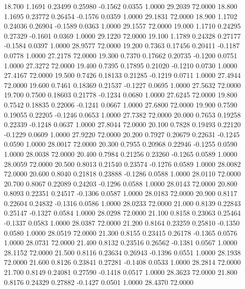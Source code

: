   18.700   1.1691   0.23499   0.25980  -0.1562   0.0355   1.0000  29.2039  72.0000
  18.800   1.1695   0.23772   0.26454  -0.1576   0.0359   1.0000  29.1831  72.0000
  18.900   1.1702   0.24036   0.26904  -0.1589   0.0363   1.0000  29.1557  72.0000
  19.000   1.1710   0.24295   0.27329  -0.1601   0.0369   1.0000  29.1220  72.0000
  19.100   1.1789   0.24328   0.27177  -0.1584   0.0397   1.0000  28.9577  72.0000
  19.200   0.7363   0.17456   0.20411  -0.1187   0.0778   1.0000  27.2178  72.0000
  19.300   0.7370   0.17662   0.20735  -0.1200   0.0751   1.0000  27.3272  72.0000
  19.400   0.7395   0.17895   0.21020  -0.1210   0.0730   1.0000  27.4167  72.0000
  19.500   0.7426   0.18133   0.21285  -0.1219   0.0711   1.0000  27.4944  72.0000
  19.600   0.7461   0.18369   0.21537  -0.1227   0.0695   1.0000  27.5632  72.0000
  19.700   0.7500   0.18603   0.21778  -0.1234   0.0680   1.0000  27.6245  72.0000
  19.800   0.7542   0.18835   0.22006  -0.1241   0.0667   1.0000  27.6800  72.0000
  19.900   0.7590   0.19055   0.22205  -0.1246   0.0653   1.0000  27.7382  72.0000
  20.000   0.7653   0.19258   0.22339  -0.1248   0.0637   1.0000  27.8044  72.0000
  20.100   0.7828   0.19493   0.22120  -0.1229   0.0609   1.0000  27.9220  72.0000
  20.200   0.7927   0.20679   0.22631  -0.1245   0.0590   1.0000  28.0017  72.0000
  20.300   0.7955   0.20968   0.22946  -0.1255   0.0590   1.0000  28.0038  72.0000
  20.400   0.7984   0.21256   0.23260  -0.1265   0.0589   1.0000  28.0059  72.0000
  20.500   0.8013   0.21540   0.23574  -0.1276   0.0589   1.0000  28.0082  72.0000
  20.600   0.8040   0.21818   0.23888  -0.1286   0.0588   1.0000  28.0110  72.0000
  20.700   0.8067   0.22089   0.24203  -0.1296   0.0588   1.0000  28.0143  72.0000
  20.800   0.8093   0.22351   0.24517  -0.1306   0.0587   1.0000  28.0183  72.0000
  20.900   0.8117   0.22604   0.24832  -0.1316   0.0586   1.0000  28.0233  72.0000
  21.000   0.8139   0.22843   0.25147  -0.1327   0.0584   1.0000  28.0298  72.0000
  21.100   0.8158   0.23063   0.25464  -0.1337   0.0583   1.0000  28.0387  72.0000
  21.200   0.8164   0.23259   0.25810  -0.1350   0.0580   1.0000  28.0519  72.0000
  21.300   0.8155   0.23415   0.26178  -0.1365   0.0576   1.0000  28.0731  72.0000
  21.400   0.8132   0.23516   0.26562  -0.1381   0.0567   1.0000  28.1152  72.0000
  21.500   0.8116   0.23634   0.26943  -0.1396   0.0551   1.0000  28.1938  72.0000
  21.600   0.8126   0.23841   0.27281  -0.1408   0.0533   1.0000  28.2814  72.0000
  21.700   0.8149   0.24081   0.27590  -0.1418   0.0517   1.0000  28.3623  72.0000
  21.800   0.8176   0.24329   0.27882  -0.1427   0.0501   1.0000  28.4370  72.0000
